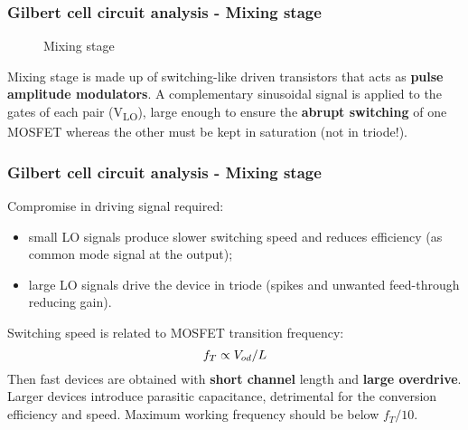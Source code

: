 \begin{frame}
	\frametitle{Gilbert cell circuit analysis - Mixing stage}
	\begin{figure} [H]
		\centering
		\caption{Mixing stage}
		\label{fig:MixStage}
	\end{figure}
	Mixing stage is made up of switching-like driven transistors that acts as \textbf{pulse amplitude modulators}. %
	A complementary sinusoidal signal is applied to the gates of each pair (V\textsubscript{LO}), large enough to ensure the \textbf{abrupt switching} of one MOSFET whereas the other must be kept in saturation (not in  triode!).
\end{frame}

\begin{frame}
	\frametitle{Gilbert cell circuit analysis - Mixing stage}
	Compromise in driving signal required:
	\begin{itemize}
		\item small LO signals produce slower switching speed and reduces efficiency (as common mode signal at the output);
		\item large LO signals drive the device in triode (spikes and unwanted feed-through reducing gain).
	\end{itemize}
	Switching speed is related to MOSFET transition frequency:
	\begin{equation}
	f_T \propto  V_{od}/L \notag
	\end{equation}
	Then fast devices are obtained with \textbf{short channel} length and \textbf{large overdrive}. Larger devices introduce parasitic capacitance, detrimental for the conversion efficiency and speed. Maximum working frequency should be below $f_T/10$.
\end{frame}

